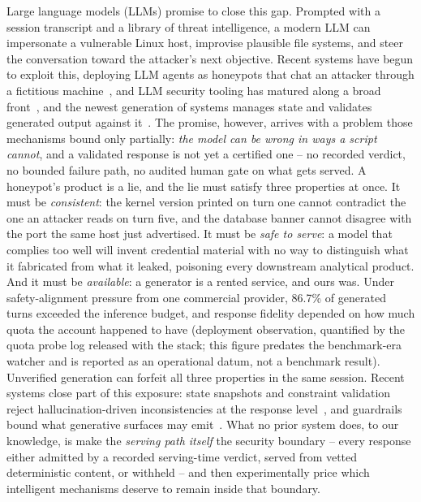 Large language models (LLMs) promise to close this gap. Prompted with a
session transcript and a library of threat intelligence, a modern LLM can
impersonate a vulnerable Linux host, improvise plausible file systems, and
steer the conversation toward the attacker's next objective. Recent systems
have begun to exploit this, deploying LLM agents as honeypots that chat an
attacker through a fictitious machine~\cite{reworr2024}, and LLM
security tooling has matured along a broad
front~\cite{wang2024,paul2025}, and the newest generation of systems
manages state and validates generated output against
it~\cite{li2026llmsshh,laragutierrez2026genpot,wang2026honeygpt}. The
promise, however, arrives with a problem those mechanisms bound only
partially: \emph{the model can be wrong in ways a script cannot}, and a
validated response is not yet a certified one -- no recorded verdict,
no bounded failure path, no audited human gate on what gets served. A
honeypot's product is a lie, and the lie must satisfy three properties at
once. It must be \emph{consistent}: the kernel version printed on turn one
cannot contradict the one an attacker reads on turn five, and the database
banner cannot disagree with the port the same host just advertised. It
must be \emph{safe to serve}: a model that complies too well will invent
credential material with no way to distinguish what it fabricated from
what it leaked, poisoning every downstream analytical product. And it
must be \emph{available}: a generator is a rented service, and ours was.
Under safety-alignment pressure from one commercial provider, 86.7\% of
generated turns exceeded the inference budget, and response fidelity
depended on how much quota the account happened to have (deployment
observation, quantified by the quota probe log released with the
stack; this figure predates the benchmark-era watcher and is reported
as an operational datum, not a benchmark result). Unverified
generation can forfeit all three properties in the same session.
Recent systems close part of this exposure: state snapshots and
constraint validation reject hallucination-driven inconsistencies
at the response level~\cite{li2026llmsshh}, and guardrails bound what
generative surfaces may emit~\cite{laragutierrez2026genpot}. What no
prior system does, to our knowledge, is make the \emph{serving path
itself} the security boundary -- every response either admitted by a
recorded serving-time verdict, served from vetted deterministic content,
or withheld -- and then experimentally price which intelligent
mechanisms deserve to remain inside that boundary.

